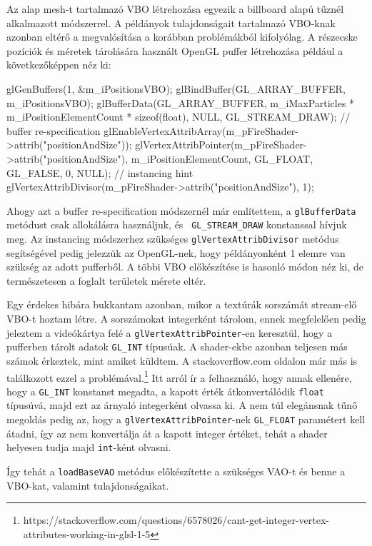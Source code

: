 Az alap mesh-t tartalmazó VBO létrehozása egyezik a billboard alapú tűznél alkalmazott módszerrel. A példányok tulajdonságait tartalmazó VBO-knak azonban eltérő a megvalósítása a korábban problémákból kifolyólag. A részecske pozíciók és méretek tárolására használt OpenGL puffer létrehozása például a következőképpen néz ki:
\begin{cpp}
glGenBuffers(1, &m_iPositionsVBO);
glBindBuffer(GL_ARRAY_BUFFER, m_iPositionsVBO);
glBufferData(GL_ARRAY_BUFFER, 
	m_iMaxParticles * m_iPositionElementCount * sizeof(float), 
	NULL, GL_STREAM_DRAW); // buffer re-specification
glEnableVertexAttribArray(m_pFireShader->attrib("positionAndSize"));
glVertexAttribPointer(m_pFireShader->attrib("positionAndSize"), 
	m_iPositionElementCount, GL_FLOAT, GL_FALSE, 0, NULL);
// instancing hint
glVertexAttribDivisor(m_pFireShader->attrib("positionAndSize"), 1);
\end{cpp}
Ahogy azt a buffer re-specification módszernél már említettem, a \texttt{glBufferData} metódust csak allokálásra használjuk, és \texttt{ GL\_STREAM\_DRAW} konstanssal hívjuk meg. Az instancing módszerhez szükséges \texttt{glVertexAttribDivisor} metódus segítségével pedig jelezzük az OpenGL-nek, hogy példányonként 1 elemre van szükség az adott pufferből. A többi VBO előkészítése is hasonló módon néz ki, de természetesen a foglalt területek mérete eltér.

Egy érdekes hibára bukkantam azonban, mikor a textúrák sorszámát stream-elő VBO-t hoztam létre. A sorszámokat integerként tárolom, ennek megfelelően pedig jeleztem a videókártya felé a \texttt{glVertexAttribPointer}-en keresztül, hogy a pufferben tárolt adatok \texttt{GL\_INT} típusúak. A shader-ekbe azonban teljesen más számok érkeztek, mint amiket küldtem. A stackoverflow.com oldalon már más is találkozott ezzel a problémával.\footnote{https://stackoverflow.com/questions/6578026/cant-get-integer-vertex-attributes-working-in-glsl-1-5} Itt arról ír a felhasználó, hogy annak ellenére, hogy a \texttt{GL\_INT} konstanst megadta, a kapott érték átkonvertálódik \texttt{float} típusúvá, majd ezt az árnyaló integerként olvassa ki. A nem túl elegánsnak tűnő megoldás pedig az, hogy a \texttt{glVertexAttribPointer}-nek  \texttt{GL\_FLOAT} paramétert kell átadni, így az nem konvertálja át a kapott integer értéket, tehát a shader helyesen tudja majd \texttt{int}-ként olvasni.

Így tehát a \texttt{loadBaseVAO} metódus előkészítette a szükséges VAO-t és benne a VBO-kat, valamint tulajdonságaikat.

